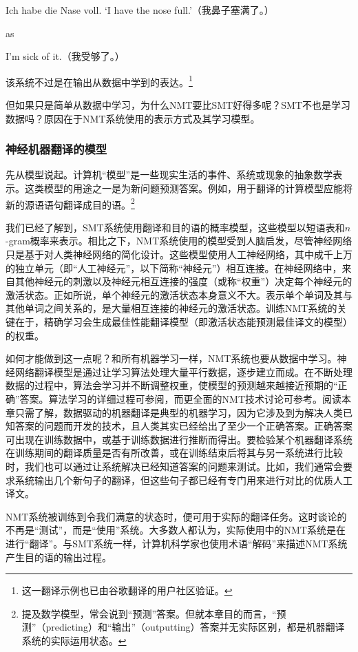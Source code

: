 \documentclass[output=paper]{langscibook}
\begin{document}
\ea
Ich habe die Nase voll.
\glt ‘I have the nose full.'（我鼻子塞满了。）
\z

\noindent as

\newpage
\ea
I'm sick of it.（我受够了。）
\z

该系统不过是在输出从数据中学到的表达。\footnote{这一翻译示例也已由谷歌翻译的用户社区验证。}

但如果只是简单从数据中学习，为什么NMT要比SMT好得多呢？SMT不也是学习数据吗？原因在于NMT系统使用的表示方式及其学习模型。


\subsubsection{神经机器翻译的模型}
先从模型说起。计算机“模型”是一些现实生活的事件、系统或现象的抽象数学表示。这类模型的用途之一是为新问题预测答案。例如，用于翻译的计算模型应能将新的源语语句翻译成目的语。\footnote{提及数学模型，常会说到“预测”答案。但就本章目的而言，“预测”（predicting）和“输出”（outputting）答案并无实际区别，都是机器翻译系统的实际运用状态。} 

我们已经了解到，SMT系统使用翻译和目的语的概率模型，这些模型以短语表和$n$-gram概率来表示。相比之下，NMT系统使用的模型受到人脑启发，尽管神经网络只是基于对人类神经网络的简化设计。这些模型使用人工神经网络，其中成千上万的独立单元（即“人工神经元”，以下简称“神经元”）相互连接。在神经网络中，来自其他神经元的刺激以及神经元相互连接的强度（或称“权重”）决定每个神经元的激活状态。正如\citet{Forcada2017}所说，单个神经元的激活状态本身意义不大。表示单个单词及其与其他单词之间关系的，是大量相互连接的神经元的激活状态。训练NMT系统的关键在于，精确学习会生成最佳性能翻译模型（即激活状态能预测最佳译文的模型）的权重。

如何才能做到这一点呢？和所有机器学习一样，NMT系统也要从数据中学习。神经网络翻译模型是通过让学习算法处理大量平行数据，逐步建立而成。在不断处理数据的过程中，算法会学习并不断调整权重，使模型的预测越来越接近预期的“正确”答案。算法学习的详细过程可参阅，而更全面的NMT技术讨论可参考\citet{Koehn2020}。阅读本章只需了解，数据驱动的机器翻译是典型的机器学习，因为它涉及到为解决人类已知答案的问题而开发的技术，且人类其实已经给出了至少一个正确答案。正确答案可出现在训练数据中，或基于训练数据进行推断而得出。要检验某个机器翻译系统在训练期间的翻译质量是否有所改善，或在训练结束后将其与另一系统进行比较时，我们也可以通过让系统解决已经知道答案的问题来测试。比如，我们通常会要求系统输出几个新句子的翻译，但这些句子都已经有专门用来进行对比的优质人工译文。   

NMT系统被训练到令我们满意的状态时，便可用于实际的翻译任务。这时谈论的不再是“测试”，而是“使用”系统。大多数人都认为，实际使用中的NMT系统是在进行“翻译”。与SMT系统一样，计算机科学家也使用术语“解码”来描述NMT系统产生目的语的输出过程。
\end{document}
